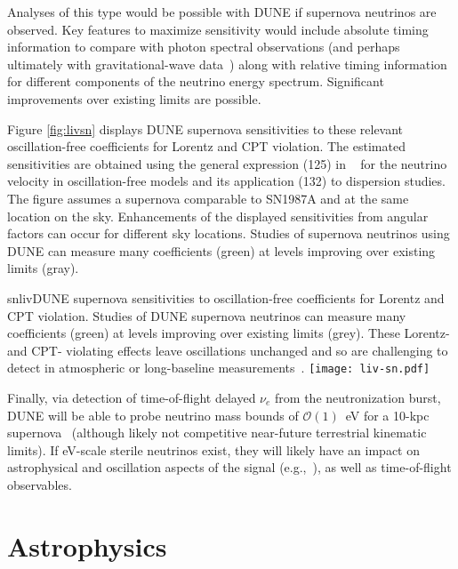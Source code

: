 Analyses of this type would be possible with DUNE if supernova neutrinos are observed. Key features to maximize sensitivity would include absolute timing information to compare with photon spectral observations (and perhaps ultimately with gravitational-wave data~\cite{Kostelecky:2016kfm})  along with relative timing information for different components of the neutrino energy spectrum. Significant improvements over existing limits are possible.

Figure \ref{fig:livsn} displays DUNE supernova sensitivities 
to these relevant oscillation-free coefficients 
for Lorentz and CPT violation.
The estimated sensitivities are obtained using
the general expression (125) in ~\cite{Kostelecky:2011gq}
for the neutrino velocity in oscillation-free models
and its application (132) to dispersion studies.
The figure assumes a supernova comparable to SN1987A
and at the same location on the sky.
Enhancements of the displayed sensitivities 
from angular factors can occur for different sky locations.
Studies of supernova neutrinos using DUNE 
can measure many coefficients (green) 
at levels improving over existing limits (gray).

\begin{dunefigure}{snliv}{DUNE supernova sensitivities to oscillation-free coefficients for Lorentz and CPT violation. Studies of DUNE supernova neutrinos can measure many coefficients (green) at levels improving over existing limits (grey). These Lorentz- and CPT- violating effects leave oscillations unchanged and so are challenging to detect in atmospheric or long-baseline measurements~\cite{kostelecky}.\label{fig:livsn}}
\texttt{[image: liv-sn.pdf]}
\end{dunefigure}

Finally, via detection of time-of-flight delayed $\nu_e$ from the  neutronization burst,  DUNE will be able to probe neutrino mass bounds of $\mathcal{O}(1)$~eV for a 10-kpc supernova~\cite{Rossi-Torres:2015rla} (although likely not competitive near-future terrestrial kinematic limits).  If eV-scale sterile neutrinos exist, they will likely have an impact on astrophysical and oscillation aspects of the signal (e.g.,~\cite{Keranen:2007ga,Tamborra:2011is,Esmaili:2014gya}), as well as time-of-flight observables. \\


\section{Astrophysics}
\label{sec:physics-snblowe-astrophysics}


